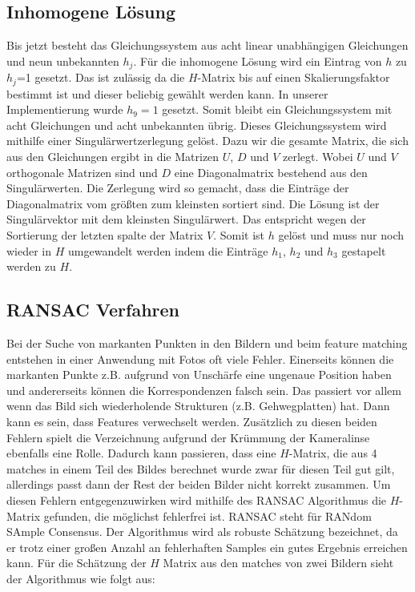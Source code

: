 \subsection{Inhomogene Lösung}
Bis jetzt besteht das Gleichungssystem aus acht linear unabhängigen Gleichungen und neun unbekannten $h_j$. Für die inhomogene Lösung wird ein Eintrag von $h$ zu $h_j$=1 gesetzt. Das ist zulässig da die $H$-Matrix bis auf einen Skalierungsfaktor bestimmt ist und dieser beliebig gewählt werden kann. In unserer Implementierung wurde $h_9=1$ gesetzt. Somit bleibt ein Gleichungssystem mit acht Gleichungen und acht unbekannten übrig.
Dieses Gleichungssystem wird mithilfe einer Singulärwertzerlegung gelöst. Dazu wir die gesamte Matrix, die sich aus den Gleichungen ergibt in die Matrizen $U$, $D$ und $V$ zerlegt. Wobei $U$ und $V$ orthogonale Matrizen sind und $D$ eine Diagonalmatrix bestehend aus den Singulärwerten. Die Zerlegung wird so gemacht, dass die Einträge der Diagonalmatrix vom größten zum kleinsten sortiert sind. Die Lösung ist der Singulärvektor mit dem kleinsten Singulärwert. Das entspricht wegen der Sortierung der letzten spalte der Matrix $V$. Somit ist $h$ gelöst und muss nur noch wieder in $H$ umgewandelt werden indem die Einträge $h_1$, $h_2$ und $h_3$ gestapelt werden zu $H$.

\subsection{RANSAC Verfahren}
Bei der Suche von markanten Punkten in den Bildern und beim feature matching entstehen in einer Anwendung mit Fotos oft viele Fehler. Einerseits können die markanten Punkte z.B. aufgrund von Unschärfe eine ungenaue Position haben und andererseits können die Korrespondenzen falsch sein. Das passiert vor allem wenn das Bild sich wiederholende Strukturen (z.B. Gehwegplatten) hat. Dann kann es sein, dass Features verwechselt werden. Zusätzlich zu diesen beiden Fehlern spielt die Verzeichnung aufgrund der Krümmung der Kameralinse ebenfalls eine Rolle. Dadurch kann passieren, dass eine $H$-Matrix, die aus 4 matches in einem Teil des Bildes berechnet wurde zwar für diesen Teil gut gilt, allerdings passt dann der Rest der beiden Bilder nicht korrekt zusammen.
Um diesen Fehlern entgegenzuwirken wird mithilfe des RANSAC Algorithmus die $H$-Matrix gefunden, die möglichst fehlerfrei ist. RANSAC steht für RANdom SAmple Consensus. Der Algorithmus wird als robuste Schätzung bezeichnet, da er trotz einer großen Anzahl an fehlerhaften Samples ein gutes Ergebnis erreichen kann. Für die Schätzung der $H$ Matrix aus den matches von zwei Bildern sieht der Algorithmus wie folgt aus:

